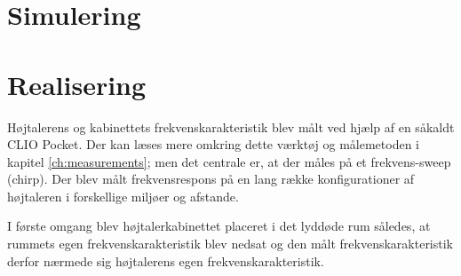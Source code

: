 \section{Simulering}

\newpage
\section{Realisering}
Højtalerens og kabinettets frekvenskarakteristik blev målt ved hjælp af en såkaldt CLIO Pocket. Der kan læses mere omkring dette værktøj og målemetoden i kapitel \ref{ch:measurements}; men det centrale er, at der måles på et frekvens-sweep (chirp). Der blev målt frekvensrespons på en lang række konfigurationer af højtaleren i forskellige miljøer og afstande.

I første omgang blev højtalerkabinettet placeret i det lyddøde rum således, at rummets egen frekvenskarakteristik blev nedsat og den målt frekvenskarakteristik derfor nærmede sig højtalerens egen frekvenskarakteristik.


